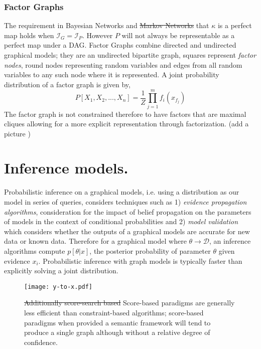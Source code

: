 \documentclass[7pt]{article}
\begin{document}
\subsubsection{Factor Graphs}
The requirement in Bayesian Networks and \st{Markov Networks} that $\mathcal{\kappa}$ is a perfect map holds when $\mathcal{I}_G = \mathcal{I}_P$. However $P$ will not always be representable as a perfect map under a DAG.  Factor Graphs \cite{kschischang2001factor} combine directed and undirected graphical models; they are an undirected bipartite graph, squares represent \emph{factor nodes}, round nodes representing random variables and edges from all random variables to any such node where it is represented. A joint probability distribution of a factor graph is given by,
\begin{equation}
P[X_1,X_2,...,X_n] = \dfrac{1}{Z} \prod_{j=1}^{m} f_i (x_{f_j})
\end{equation}
The factor graph is not constrained therefore to have factors that are maximal cliques allowing for a more explicit representation through factorization. (add a picture	)

\section{Inference models.}
Probabilistic inference on a graphical models, i.e. using a distribution as our model in series of queries, considers techniques such as 1) \emph{evidence propagation algorithms}, consideration for the impact of belief propagation  on the parameters of models in the context of conditional probabilities and 2) \emph{model validation} which considers whether the outputs of a graphical models  are accurate for new data or known data.  Therefore for a graphical model where $\theta \rightarrow \mathcal{D}$, an inference algorithms compute $p[\theta|x]$, the posterior probability of parameter $\theta$ given evidence $x_i$. Probabilistic inference with graph models is typically faster than explicitly solving a joint distribution. 


\begin{figure}
	\centering
	\texttt{[image: y-to-x.pdf]}
	\caption{ \st{Additionally score-search based} Score-based paradigms are generally less efficient than constraint-based algorithms; score-based paradigms when provided a semantic framework will tend to produce a single graph although without a relative degree of confidence.}
	\label{score-based-paradigm}
\end{figure}
	
\end{document}

